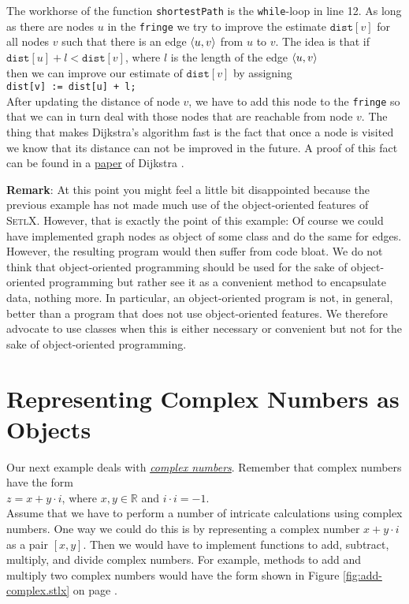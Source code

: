 The workhorse of the function \texttt{shortestPath} is the \texttt{while}-loop in line 12.  As long
as there are nodes $u$ in the \texttt{fringe} we try to improve the estimate $\mathtt{dist}[v]$ for
all nodes $v$ such that there is an edge $\pair(u,v)$ from $u$ to $v$.  The idea is that if 
\\[0.2cm]
\hspace*{1.3cm}
$\mathtt{dist}[u] + l < \mathtt{dist}[v]$, \quad where $l$ is the length of the edge $\pair(u,v)$
\\[0.2cm]
then we can improve our estimate of $\texttt{dist}[v]$ by assigning
\\[0.2cm]
\hspace*{1.3cm}
\texttt{dist[v] := dist[u] + l;}
\\[0.2cm]
After updating the distance of node $v$, we have to add this node to the \texttt{fringe} so that we
can in turn deal with those nodes that are reachable from node $v$.  The thing that makes Dijkstra's
algorithm fast is the fact that once a node is visited we know that its distance can not be improved
in the future.  A proof of this fact can be found in a 
\href{http://www-m3.ma.tum.de/foswiki/pub/MN0506/WebHome/dijkstra.pdf}{paper} of Dijkstra \cite{dijkstra:59}.
\vspace*{0.3cm}

\noindent
\textbf{Remark}:  At this point you might feel a little bit disappointed because the previous example
has not made much use of the object-oriented features of \textsc{SetlX}.  However, that is exactly
the point of this example: Of course we could have implemented graph nodes as object of some class
and do the same for edges.  However, the resulting program would then suffer from code bloat.  We do
not think that object-oriented programming should be used for the sake of object-oriented
programming but rather see it as a convenient method to encapsulate data, nothing more.  In
particular, an object-oriented program is not, in general, better than a program that does not use
object-oriented features.  We therefore advocate to use classes when this is either necessary or 
convenient but not for the sake of object-oriented programming.

\section{Representing Complex Numbers as Objects}
Our next example deals with 
\href{http://en.wikipedia.org/wiki/Complex_number}{\emph{complex numbers}}.  
Remember that complex numbers have the form
\\[0.2cm]
\hspace*{1.3cm}
$z = x + y \cdot i$, \quad where $x,y \in \mathbb{R}$ and $i \cdot i = -1$.
\\[0.2cm]
Assume that we have to perform a number of intricate calculations using complex numbers.  One way
we could do this is by representing a complex number $x + y \cdot i$ as a pair $[x,y]$.  Then we
would have to implement functions to add, subtract, multiply,  and divide complex numbers.  For
example, methods to add and multiply two complex numbers would have the form shown in Figure
\ref{fig:add-complex.stlx} on page \pageref{fig:add-complex.stlx}.
 

